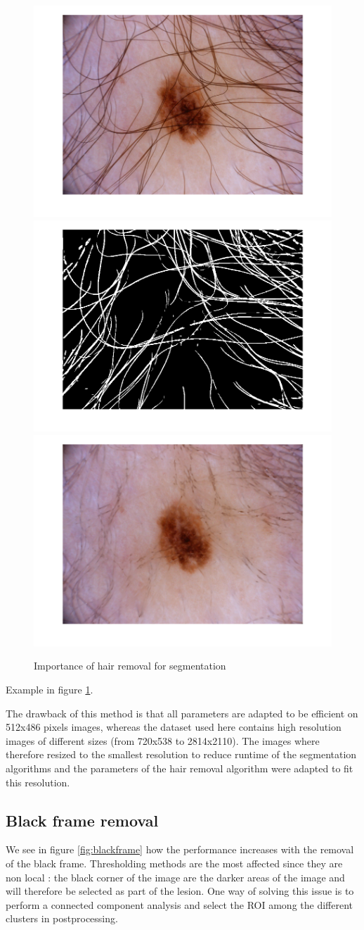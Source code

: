 \documentclass[a4paper,10pt]{article}
\begin{document}
\begin{figure}
	\centering
	\includegraphics[width=0.32\linewidth]{../results/hair-removal/im_095} 
	\includegraphics[width=0.32\linewidth]{../results/hair-removal/hairmask_denoised_095} 
	\includegraphics[width=0.32\linewidth]{../results/hair-removal/imshaved_095} 
	\caption{Importance of hair removal for segmentation}
	\label{fig:dullrazor}
\end{figure}

Example in figure \ref{fig:dullrazor}.

The drawback of this method is that all parameters are adapted to be efficient on 512x486 pixels images, whereas the dataset used here contains high resolution images of different sizes (from 720x538 to 2814x2110). The images where therefore resized to the smallest resolution to reduce runtime of the segmentation algorithms and the parameters of the hair removal algorithm were adapted to fit this resolution.

\subsection{Black frame removal}



We see in figure \ref{fig:blackframe} how the performance increases with the removal of the black frame. Thresholding methods are the most affected since they are non local : the black corner of the image are the darker areas of the image and will therefore be selected as part of the lesion. One way of solving this issue is to perform a connected component analysis and select the ROI among the different clusters in postprocessing.
\end{document}
